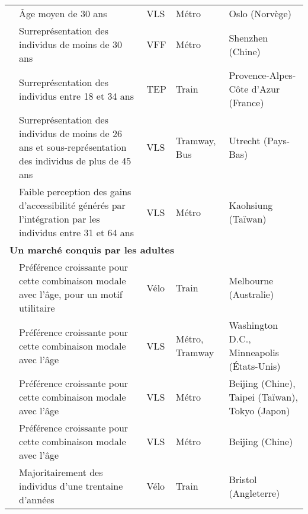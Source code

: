 \begin{longtable}{p{3cm}p{4cm}p{1.5cm}p{1.8cm}p{2.3cm}}
    \small{\textcite{bocker_bike_2020}}\index{Böcker, Lars|pagebf} & \small{Âge moyen de 30 ans} & \small{VLS} & \small{Métro} & \small{Oslo (Norvège)}\\
    \small{\textcite{guo_built_2020, guo_dockless_2021, guo_role_2021}} & \small{Surreprésentation des individus de moins de 30 ans} & \small{VFF} & \small{Métro} & \small{Shenzhen (Chine)}\\
    \small{\textcite{moinse_intermodal_2022}}\index{Moinse, Dylan|pagebf} & \small{Surreprésentation des individus entre 18 et 34 ans} & \small{TEP} & \small{Train} & \small{Provence-Alpes-Côte d'Azur (France)}\\
    \small{\textcite{kuijk_preferences_2022}}\index{van Kuijk, R.J.|pagebf} & \small{Surreprésentation des individus de moins de 26 ans et sous-représentation des individus de plus de 45 ans} & \small{VLS} & \small{Tramway, Bus} & \small{Utrecht (Pays-Bas)}\\
    \small{\textcite{cheng_expanding_2018}}\index{Cheng, Yung-Hsiang|pagebf} & \small{Faible perception des gains d'accessibilité générés par l'intégration par les individus entre 31 et 64 ans} & \small{VLS} & \small{Métro} & \small{Kaohsiung (Taïwan)}\\
    \hline
\multicolumn{5}{l}{\textbf{Un marché conquis par les adultes}}\\
    \small{\textcite{weliwitiya_bicycle_2019}}\index{Weliwitiya, Hesara|pagebf} & \small{Préférence croissante pour cette combinaison modale avec l'âge, pour un motif utilitaire} & \small{Vélo} & \small{Train} & \small{Melbourne (Australie)}\\
    \small{\textcite{martin_evaluating_2014}}\index{Martin, Elliot W.|pagebf} & \small{Préférence croissante pour cette combinaison modale avec l'âge} & \small{VLS} & \small{Métro, Tramway} & \small{Washington D.C., Minneapolis (États-Unis)}\\
    \small{\textcite{lin_built_2018}}\index{Lin, Jen-Jia|pagebf} & \small{Préférence croissante pour cette combinaison modale avec l'âge} & \small{VLS} & \small{Métro} & \small{Beijing (Chine), Taipei (Taïwan), Tokyo (Japon)}\\
    \small{\textcite{zhao_public_2022}}\index{Zhao, Pengjun|pagebf} & \small{Préférence croissante pour cette combinaison modale avec l'âge} & \small{VLS} & \small{Métro} & \small{Beijing (Chine)}\\
    \small{\textcite{sherwin_practices_2011}}\index{Sherwin, Henrietta|pagebf} & \small{Majoritairement des individus d'une trentaine d'années} & \small{Vélo} & \small{Train} & \small{Bristol (Angleterre)}\\

\end{longtable}
